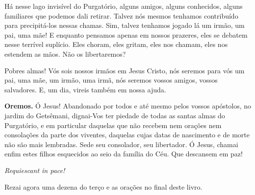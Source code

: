 Há nesse lago invisível do Purgatório, alguns amigos, alguns conhecidos, alguns familiares que podemos dali retirar. Talvez nós mesmos tenhamos contribuído para precipitá-los nessas chamas. Sim, talvez tenhamos jogado lá um irmão, um pai, uma mãe! E enquanto pensamos apenas em nossos prazeres, eles se debatem nesse terrível suplício. Eles choram, eles gritam, eles nos chamam, eles nos estendem as mãos. Não os libertaremos?

Pobres almas! Vós sois nossos irmãos em Jesus Cristo, nós seremos para vós um pai, uma mãe, um irmão, uma irmã, nós seremos vossos amigos, vossos salvadores. E, um dia, vireis também em nossa ajuda. 


\vspace{\baselineskip}\noindent \textbf{Oremos.} Ó Jesus! Abandonado por todos e até mesmo pelos vossos apóstolos, no jardim do Getsêmani, dignai-Vos ter piedade de todas as santas almas do Purgatório, e em particular daquelas que não recebem nem orações nem consolações da parte dos viventes, daquelas cujas datas de nascimento e de morte não são mais lembradas. Sede seu consolador, seu libertador. Ó Jesus, chamai enfim estes filhos esquecidos ao seio da família do Céu. Que descansem em paz!



\begin{center}
\textit{Requiescant in pace!}
\end{center}

Rezai agora uma dezena do terço e as orações no final deste livro.
